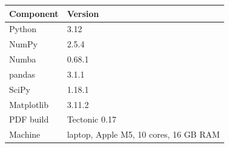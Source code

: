 \begin{tabular}{ll}
\toprule
Component & Version \\
\midrule
Python & 3.12 \\
NumPy & 2.5.4 \\
Numba & 0.68.1 \\
pandas & 3.1.1 \\
SciPy & 1.18.1 \\
Matplotlib & 3.11.2 \\
PDF build & Tectonic 0.17 \\
Machine & laptop, Apple M5, 10 cores, 16 GB RAM \\
\bottomrule
\end{tabular}
